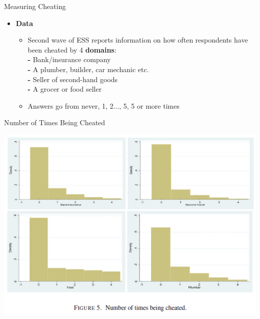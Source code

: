 \documentclass[pdftex,12pt,xcolor=pdftex,table]{beamer}
\begin{document}
\begin{frame}{Measuring Cheating}
    \begin{itemize}
        \item \textbf{Data}
        \begin{itemize}
            \item Second wave of ESS reports information on how often respondents have been cheated by 4 \textbf{domains}: \\
            \textbf{-} Bank/insurance company\\
            \textbf{-} A plumber, builder, car mechanic etc. \\
            \textbf{-} Seller of second-hand goods \\
            \textbf{-} A grocer or food seller\\ \pause
            \item Answers go from never, 1, 2..., 5, 5 or more times
        \end{itemize}
    \end{itemize}
\end{frame}
\begin{frame}{ Number of Times Being Cheated}
    \begin{center}
        \includegraphics[scale=0.82]{figure_5.PNG}
    \end{center}
\end{frame}
\end{document}
